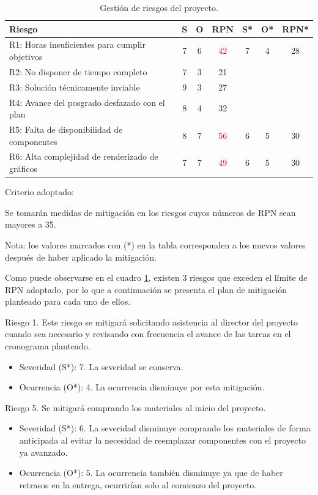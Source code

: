 \documentclass[
11pt, %
]{charter}
\begin{document}
\begin{table}[htpb]
\centering
\begin{tabularx}{\linewidth}{@{}|X|c|c|c|c|c|c|@{}}
\hline
\rowcolor[HTML]{C0C0C0} 
Riesgo & S & O & RPN & S* & O* & RPN* \\ \hline
R1: Horas insuficientes para cumplir objetivos & 7 & 6 & \textcolor{red}{42} & 7 & 4 & 28 \\ \hline
R2: No disponer de tiempo completo & 7 & 3 & 21 &  &  &  \\ \hline
R3: Solución técnicamente inviable & 9 & 3 & 27 &  &  &  \\ \hline
R4: Avance del posgrado desfazado con el plan & 8 & 4 & 32 &  &  &  \\ \hline
R5: Falta de disponibilidad de componentes & 8 & 7 & \textcolor{red}{56} & 6 & 5 & 30 \\ \hline
R6: Alta complejidad de renderizado de gráficos & 7 & 7 & \textcolor{red}{49} & 6 & 5 & 30 \\ \hline
\end{tabularx}%
\caption{Gestión de riesgos del proyecto.}
	\label{tab:riesgos}
\end{table}

Criterio adoptado: 

Se tomarán medidas de mitigación en los riesgos cuyos números de RPN sean mayores a 35.

Nota: los valores marcados con (*) en la tabla corresponden a los nuevos valores después de haber aplicado la mitigación.


Como puede observarse en el cuadro \ref{tab:riesgos}, existen 3 riesgos que exceden el límite de RPN adoptado, por lo que a continuación se presenta el plan de mitigación planteado para cada uno de ellos.

 
Riesgo 1. Este riesgo se mitigará solicitando asistencia al director del proyecto cuando sea necesario y revisando con frecuencia el avance de las tareas en el cronograma planteado.			
\begin{itemize}
	\item Severidad (S*): 7. La severidad se conserva.
	\item Ocurrencia (O*): 4. La ocurrencia disminuye por esta mitigación.
\end{itemize}

Riesgo 5. Se mitigará comprando los materiales al inicio del proyecto.		
\begin{itemize}
	\item Severidad (S*): 6. La severidad disminuye comprando los materiales de forma anticipada al evitar la necesidad de reemplazar componentes con el proyecto ya avanzado.
	\item Ocurrencia (O*): 5. La ocurrencia también disminuye ya que de haber retrasos en la entrega, ocurrirían solo al comienzo del proyecto.
\end{itemize}
\end{document}
